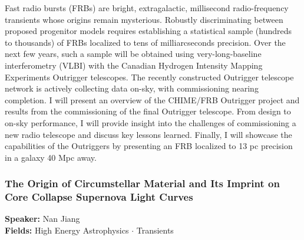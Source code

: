 Fast radio bursts (FRBs) are bright, extragalactic, millisecond radio-frequency transients whose origins remain mysterious. Robustly discriminating between proposed progenitor models requires establishing a statistical sample (hundreds to thousands) of FRBs localized to tens of milliarcseconds precision. Over the next few years, such a sample will be obtained using very-long-baseline interferometry (VLBI) with the Canadian Hydrogen Intensity Mapping Experiments Outrigger telescopes. The recently constructed Outrigger telescope network is actively collecting data on-sky, with commissioning nearing completion. I will present an overview of the CHIME/FRB Outrigger project and results from the commissioning of the final Outrigger telescope. From design to on-sky performance, I will provide insight into the challenges of commissioning a new radio telescope and discuss key lessons learned. Finally, I will showcase the capabilities of the Outriggers by presenting an FRB localized to 13 pc precision in a galaxy 40 Mpc away.

\hypertarget{abstract-talk-269}{}\label{abstract-page-talk-269}
\subsubsection*{The Origin of Circumstellar Material and Its Imprint on Core Collapse Supernova Light Curves}
\textbf{Speaker:} Nan Jiang\\
\textbf{Fields:} High Energy Astrophysics $\cdot$ Transients

